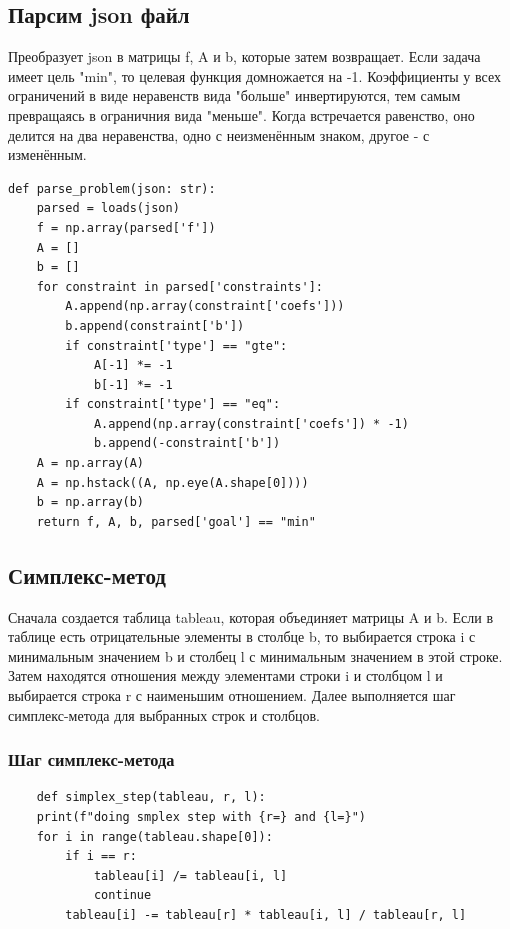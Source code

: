 \documentclass{article}
\begin{document}
\subsection{Парсим json файл}

Преобразует json в матрицы f, A и b, которые затем возвращает. Если задача имеет цель "min", то целевая функция домножается на -1.
Коэффициенты у всех ограничений в виде неравенств вида "больше" инвертируются, тем самым превращаясь в ограничния вида "меньше".
Когда встречается равенство, оно делится на два неравенства, одно с неизменённым знаком, другое - с изменённым.

\begin{listing}[H]
    \begin{verbatim}
def parse_problem(json: str):
    parsed = loads(json)
    f = np.array(parsed['f'])
    A = []
    b = []
    for constraint in parsed['constraints']:
        A.append(np.array(constraint['coefs']))
        b.append(constraint['b'])
        if constraint['type'] == "gte":
            A[-1] *= -1
            b[-1] *= -1
        if constraint['type'] == "eq":
            A.append(np.array(constraint['coefs']) * -1)
            b.append(-constraint['b'])
    A = np.array(A)
    A = np.hstack((A, np.eye(A.shape[0])))
    b = np.array(b)
    return f, A, b, parsed['goal'] == "min"
    \end{verbatim}
\end{listing}

\subsection{Симплекс-метод}

Сначала создается таблица tableau, которая объединяет матрицы A и b. Если в таблице есть отрицательные элементы в столбце b, то выбирается строка i с минимальным значением b и столбец l с минимальным значением в этой строке. Затем находятся отношения между элементами строки i и столбцом l и выбирается строка r с наименьшим отношением. Далее выполняется шаг симплекс-метода для выбранных строк и столбцов.

\subsubsection{Шаг симплекс-метода}
\begin{listing}[H]
    \begin{verbatim}
    def simplex_step(tableau, r, l):
    print(f"doing smplex step with {r=} and {l=}")
    for i in range(tableau.shape[0]):
        if i == r:
            tableau[i] /= tableau[i, l]
            continue
        tableau[i] -= tableau[r] * tableau[i, l] / tableau[r, l]
    \end{verbatim}
\end{listing}
\end{document}
